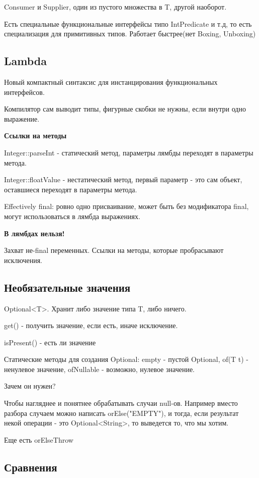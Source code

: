 \documentclass{article}
\begin{document}
Consumer и Supplier, один из пустого множества в T, другой наоборот.

Есть специальные функциональные интерфейсы типо IntPredicate и т.д, то есть специализация для примитивных типов. Работает быстрее(нет Boxing, Unboxing)

\subsection{Lambda}

Новый компактный синтаксис для инстанцирования функциональных интерфейсов.

Компилятор сам выводит типы, фигурные скобки не нужны, если внутри одно выражение.

\textbf{Ссылки на методы}

Integer::parseInt - статический метод, параметры лямбды переходят в параметры метода.

Integer::floatValue - нестатический метод, первый параметр - это сам объект, оставшиеся переходят в параметры метода.

Effectively final: ровно одно присваивание, может быть без модификатора final, могут использоваться в лямбда выражениях.

\textbf{В лямбдах нельзя!}

Захват не-final переменных. Ссылки на методы, которые пробрасывают исключения.

\subsection{Необязательные значения}

Optional<T>. Хранит либо значение типа T, либо ничего.

get() - получить значение, если есть, иначе исключение.

isPresent() - есть ли значение

Статические методы для создания Optional: empty - пустой Optional, of(T t) - ненулевое значение, ofNullable - возможно, нулевое значение.

Зачем он нужен?

Чтобы нагляднее и понятнее обрабатывать случаи null-ов. Например вместо разбора случаем можно написать orElse("EMPTY"), и тогда, если результат некой операции - это Optional<String>, то выведется то, что мы хотим.

Еще есть orElseThrow

\subsection{Сравнения}
\end{document}
